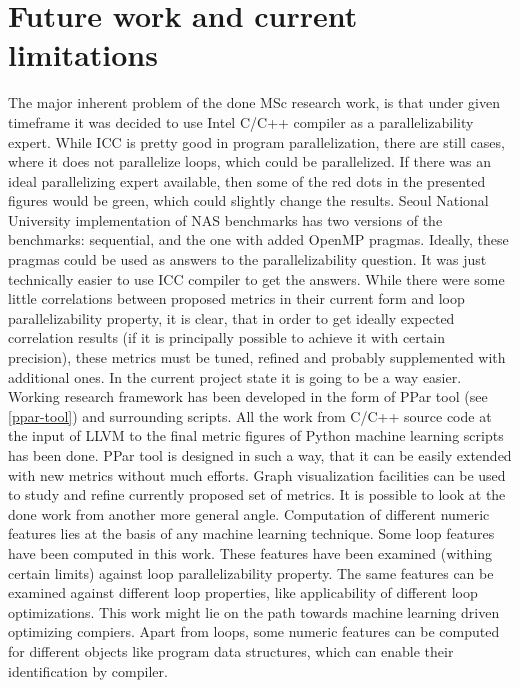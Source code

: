 \chapter{Future work and current limitations}
\label{future-work}
\qquad The major inherent problem of the done MSc research work, is that under given timeframe it was decided to use Intel C/C++ compiler as a parallelizability expert. While ICC is pretty good in program parallelization, there are still cases, where it does not parallelize loops, which could be parallelized. If there was an ideal parallelizing expert available, then some of the red dots in the presented figures would be green, which could slightly change the results. Seoul National University implementation of NAS benchmarks has two versions of the benchmarks: sequential, and the one with added OpenMP pragmas. Ideally, these pragmas could be used as answers to the parallelizability question. It was just technically easier to use ICC compiler to get the answers.\newline  
\null\qquad While there were some little correlations between proposed metrics in their current form and loop parallelizability property, it is clear, that in order to get ideally expected correlation results (if it is principally possible to achieve it with certain precision), these metrics must be tuned, refined and probably supplemented with additional ones. In the current project state it is going to be a way easier. Working research framework has been developed in the form of PPar tool (see \ref{ppar-tool}) and surrounding scripts. All the work from C/C++ source code at the input of LLVM to the final metric figures of Python machine learning scripts has been done. PPar tool is designed in such a way, that it can be easily extended with new metrics without much efforts. Graph visualization facilities can be used to study and refine currently proposed set of metrics.\newline
\null\qquad It is possible to look at the done work from another more general angle. Computation of different numeric features lies at the basis of any machine learning technique. Some loop features have been computed in this work. These features have been examined (withing certain limits) against loop parallelizability property. The same features can be examined against different loop properties, like applicability of different loop optimizations. This work might lie on the path towards machine learning driven optimizing compiers. Apart from loops, some numeric features can be computed for different objects like program data structures, which can enable their identification by compiler.